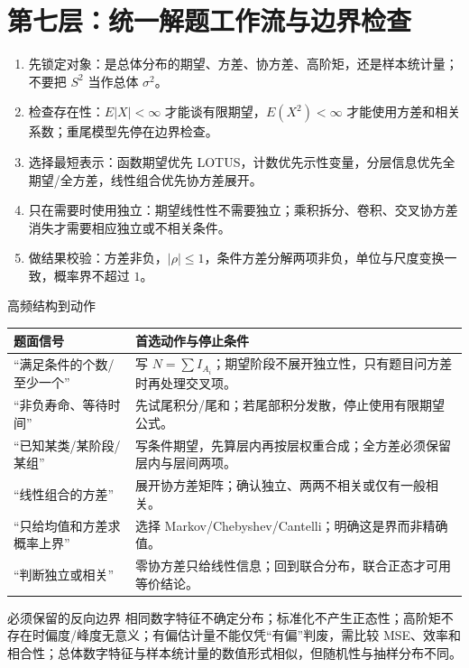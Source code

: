 \documentclass[11pt,a4paper]{ctexart}
\begin{document}
\section{第七层：统一解题工作流与边界检查}

\begin{enumerate}
  \item 先锁定对象：是总体分布的期望、方差、协方差、高阶矩，还是样本统计量；不要把 $S^2$ 当作总体 $\sigma^2$。
  \item 检查存在性：$E\lvert X\rvert<\infty$ 才能谈有限期望，$E(X^2)<\infty$ 才能使用方差和相关系数；重尾模型先停在边界检查。
  \item 选择最短表示：函数期望优先 LOTUS，计数优先示性变量，分层信息优先全期望/全方差，线性组合优先协方差展开。
  \item 只在需要时使用独立：期望线性性不需要独立；乘积拆分、卷积、交叉协方差消失才需要相应独立或不相关条件。
  \item 做结果校验：方差非负，$\lvert\rho\rvert\leq1$，条件方差分解两项非负，单位与尺度变换一致，概率界不超过 $1$。
\end{enumerate}

\begin{methodbox}{高频结构到动作}
\begin{tabularx}{\linewidth}{L{4.3cm}Y}
\toprule
题面信号 & 首选动作与停止条件\\
\midrule
“满足条件的个数/至少一个” & 写 $N=\sum I_{A_i}$；期望阶段不展开独立性，只有题目问方差时再处理交叉项。\\
“非负寿命、等待时间” & 先试尾积分/尾和；若尾部积分发散，停止使用有限期望公式。\\
“已知某类/某阶段/某组” & 写条件期望，先算层内再按层权重合成；全方差必须保留层内与层间两项。\\
“线性组合的方差” & 展开协方差矩阵；确认独立、两两不相关或仅有一般相关。\\
“只给均值和方差求概率上界” & 选择 Markov/Chebyshev/Cantelli；明确这是界而非精确值。\\
“判断独立或相关” & 零协方差只给线性信息；回到联合分布，联合正态才可用等价结论。\\
\bottomrule
\end{tabularx}
\end{methodbox}

\begin{warnbox}{必须保留的反向边界}
相同数字特征不确定分布；标准化不产生正态性；高阶矩不存在时偏度/峰度无意义；有偏估计量不能仅凭“有偏”判废，需比较 MSE、效率和相合性；总体数字特征与样本统计量的数值形式相似，但随机性与抽样分布不同。
\end{warnbox}
\end{document}
